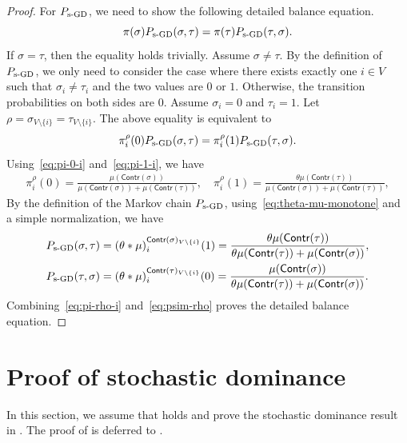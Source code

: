 \documentclass[11pt,a4paper]{article}
\newcommand{\psim}{P_{\textnormal{s-GD}}}
\theoremstyle{definition}
\begin{document}
\begin{proof}
For $\psim$, we need to show the following detailed balance equation.
\[\pi(\sigma) \psim(\sigma,\tau) = \pi(\tau) \psim(\tau,\sigma).\]
If $\sigma = \tau$, then the equality holds trivially. Assume $\sigma \neq \tau$. By the definition of $\psim$, we only need to consider the case where there exists exactly one $i \in V$ such that $\sigma_i \neq \tau_i$ and the two values are $0$ or $1$. Otherwise, the transition probabilities on both sides are 0. Assume $\sigma_i = 0$ and $\tau_i = 1$. Let $\rho = \sigma_{V \setminus \{i\}} = \tau_{V \setminus \{i\}}$. The above equality is equivalent to 
\[\pi^\rho_i(0) \psim(\sigma,\tau) = \pi^\rho_i(1) \psim(\tau,\sigma).\]
Using~\eqref{eq:pi-0-i} and~\eqref{eq:pi-1-i}, we have
\begin{align}\label{eq:pi-rho-i}
    \pi^{\rho}_i(0) = \frac{\mu(\textsf{Contr}(\sigma))}{\mu(\textsf{Contr}(\sigma))+\mu(\textsf{Contr}(\tau))}, \quad  \pi^{\rho}_i(1) = \frac{\theta \mu(\textsf{Contr}(\tau))}{\mu(\textsf{Contr}(\sigma))+\mu(\textsf{Contr}(\tau))},
\end{align}
By the definition of the Markov chain $\psim$, using~\eqref{eq:theta-mu-monotone} and a simple normalization, we have 
\begin{align}\label{eq:psim-rho}
    \begin{split}
        \psim(\sigma,\tau) &= (\theta * \mu)^{\textsf{Contr}(\sigma)_{V \setminus \{i\}}}_{i}(1) =\frac{\theta \mu(\textsf{Contr}(\tau))}{\theta \mu(\textsf{Contr}(\tau))+ \mu(\textsf{Contr}(\sigma))},\\
        \psim(\tau,\sigma) &= (\theta * \mu)^{\textsf{Contr}(\tau)_{V \setminus \{i\}}}_{i}(0) =\frac{\mu(\textsf{Contr}(\sigma))}{\theta \mu(\textsf{Contr}(\tau))+ \mu(\textsf{Contr}(\sigma))}.
    \end{split}
\end{align}
Combining~\eqref{eq:pi-rho-i} and~\eqref{eq:psim-rho} proves the detailed balance equation.
\end{proof}




\section{Proof of stochastic dominance}\label{sec:proof-stochastic-dominance}
In this section, we assume that   holds and prove the stochastic dominance result in . The proof of  is deferred to . 
\end{document}
